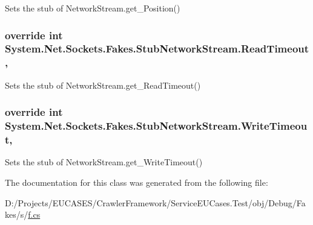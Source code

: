 Sets the stub of Network\-Stream.\-get\-\_\-\-Position()

\hypertarget{class_system_1_1_net_1_1_sockets_1_1_fakes_1_1_stub_network_stream_a07da6733efea8a3e0ba75ed0d2941729}{
\subsubsection[{Read\-Timeout}]{\setlength{\rightskip}{0pt plus 5cm}override int System.\-Net.\-Sockets.\-Fakes.\-Stub\-Network\-Stream.\-Read\-Timeout\hspace{0.3cm}{\ttfamily [get]}, {\ttfamily [set]}}}\label{class_system_1_1_net_1_1_sockets_1_1_fakes_1_1_stub_network_stream_a07da6733efea8a3e0ba75ed0d2941729}


Sets the stub of Network\-Stream.\-get\-\_\-\-Read\-Timeout()

\hypertarget{class_system_1_1_net_1_1_sockets_1_1_fakes_1_1_stub_network_stream_af385e9684d56f2d579d1d7cdc3cbc1db}{
\subsubsection[{Write\-Timeout}]{\setlength{\rightskip}{0pt plus 5cm}override int System.\-Net.\-Sockets.\-Fakes.\-Stub\-Network\-Stream.\-Write\-Timeout\hspace{0.3cm}{\ttfamily [get]}, {\ttfamily [set]}}}\label{class_system_1_1_net_1_1_sockets_1_1_fakes_1_1_stub_network_stream_af385e9684d56f2d579d1d7cdc3cbc1db}


Sets the stub of Network\-Stream.\-get\-\_\-\-Write\-Timeout()



The documentation for this class was generated from the following file\-:\begin{DoxyCompactItemize}
\item 
D\-:/\-Projects/\-E\-U\-C\-A\-S\-E\-S/\-Crawler\-Framework/\-Service\-E\-U\-Cases.\-Test/obj/\-Debug/\-Fakes/s/\hyperlink{s_2f_8cs}{f.\-cs}\end{DoxyCompactItemize}
